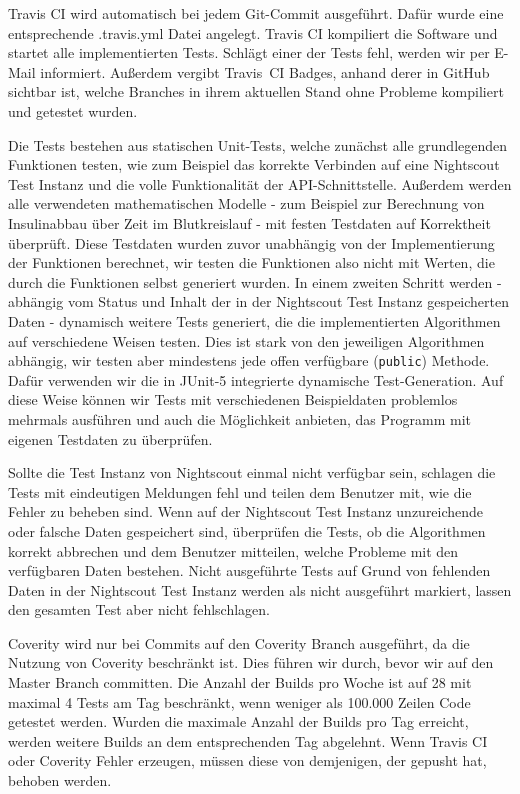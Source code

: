 \documentclass[accentcolor=tud0b,12pt,paper=a4]{tudreport}
\begin{document}
Travis CI wird automatisch bei jedem Git-Commit ausgeführt. Dafür wurde eine entsprechende .travis.yml Datei angelegt. Travis CI kompiliert die Software und startet alle implementierten Tests. Schlägt einer der Tests fehl, werden wir per E-Mail informiert. Außerdem vergibt \mbox{Travis CI} Badges, anhand derer in GitHub sichtbar ist, welche Branches in ihrem aktuellen Stand ohne Probleme kompiliert und getestet wurden.

Die Tests bestehen aus statischen Unit-Tests, welche zunächst alle grundlegenden Funktionen testen, wie zum Beispiel das korrekte Verbinden auf eine Nightscout Test Instanz und die volle Funktionalität der API-Schnittstelle. Außerdem werden alle verwendeten mathematischen Modelle - zum Beispiel zur Berechnung von Insulinabbau über Zeit im Blutkreislauf - mit festen Testdaten auf Korrektheit überprüft. Diese Testdaten wurden zuvor unabhängig von der Implementierung der Funktionen berechnet, wir testen die Funktionen also nicht mit Werten, die durch die Funktionen selbst generiert wurden. In einem zweiten Schritt werden - abhängig vom Status und Inhalt der in der Nightscout Test Instanz gespeicherten Daten - dynamisch weitere Tests generiert, die die implementierten Algorithmen auf verschiedene Weisen testen. Dies ist stark von den jeweiligen Algorithmen abhängig, wir testen aber mindestens jede offen verfügbare (\texttt{public}) Methode. Dafür verwenden wir die in JUnit-5 integrierte dynamische Test-Generation. Auf diese Weise können wir Tests mit verschiedenen Beispieldaten problemlos mehrmals ausführen und auch die Möglichkeit anbieten, das Programm mit eigenen Testdaten zu überprüfen.

Sollte die Test Instanz von Nightscout einmal nicht verfügbar sein, schlagen die Tests mit eindeutigen Meldungen fehl und teilen dem Benutzer mit, wie die Fehler zu beheben sind. Wenn auf der Nightscout Test Instanz unzureichende oder falsche Daten gespeichert sind, überprüfen die Tests, ob die Algorithmen korrekt abbrechen und dem Benutzer mitteilen, welche Probleme mit den verfügbaren Daten bestehen. Nicht ausgeführte Tests auf Grund von fehlenden Daten in der Nightscout Test Instanz  werden als nicht ausgeführt markiert, lassen den gesamten Test aber nicht fehlschlagen.

Coverity wird nur bei Commits auf den Coverity Branch ausgeführt, da die Nutzung von Coverity beschränkt ist. Dies führen wir durch, bevor wir auf den Master Branch committen. Die Anzahl der Builds pro Woche ist auf 28 mit maximal 4 Tests am Tag beschränkt, wenn weniger als 100.000 Zeilen Code getestet werden. Wurden die maximale Anzahl der Builds pro Tag erreicht, werden weitere Builds an dem entsprechenden Tag abgelehnt. Wenn Travis CI oder Coverity Fehler erzeugen, müssen diese von demjenigen, der gepusht hat, behoben werden. 
\end{document}
